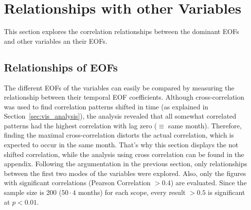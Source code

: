 \section{Relationships with other Variables}

This section explores the correlation relationships between the dominant EOFs and other variables an their EOFs. 

\subsection{Relationships of EOFs}

The different EOFs of the variables can easily be compared by measuring the relationship between their temporal EOF coefficients. 
Although cross-correlation was used to find correlation patterns shifted in time (as explained in Section~\ref{sec:vis_analysis}), the analysis revealed that all somewhat correlated patterns had the highest correlation with lag zero ($\equiv$ same month). 
Therefore, finding the maximal cross-correlation distorts the actual correlation, which is expected to occur in the same month. 
That's why this section displays the not shifted correlation, while the analysis using cross correlation can be found in the appendix. 
Following the argumentation in the previous section, only relationships between the first two modes of the variables were explored. 
Also, only the figures with significant correlations (Pearson Correlation $> 0.4$) are evaluated. 
Since the sample size is 200 ($50 \cdot 4$ months) for each scope, every result $> 0.5$ is significant at $p < 0.01$.


%
%     
%

